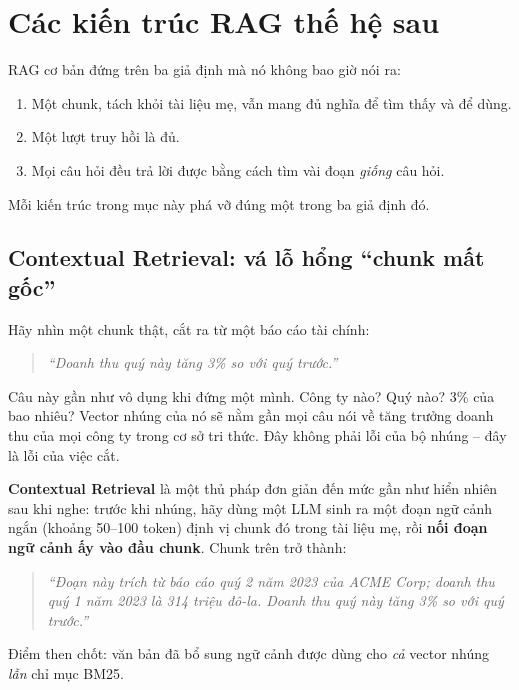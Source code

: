 
\section{Các kiến trúc RAG thế hệ sau}
\label{sec:advanced_rag_architectures}

RAG cơ bản đứng trên ba giả định mà nó không bao giờ nói ra:
\begin{enumerate}
	\item Một chunk, tách khỏi tài liệu mẹ, vẫn mang đủ nghĩa để tìm thấy và để dùng.
	\item Một lượt truy hồi là đủ.
	\item Mọi câu hỏi đều trả lời được bằng cách tìm vài đoạn \emph{giống} câu hỏi.
\end{enumerate}
Mỗi kiến trúc trong mục này phá vỡ đúng một trong ba giả định đó.

\subsection{Contextual Retrieval: vá lỗ hổng “chunk mất gốc”}
\label{ssec:contextual_retrieval}

Hãy nhìn một chunk thật, cắt ra từ một báo cáo tài chính:

\begin{quote}
\textit{“Doanh thu quý này tăng 3\% so với quý trước.”}
\end{quote}

\noindent Câu này gần như vô dụng khi đứng một mình. Công ty nào? Quý nào? 3\% của bao nhiêu? Vector nhúng của nó sẽ nằm gần mọi câu nói về tăng trưởng doanh thu của mọi công ty trong cơ sở tri thức. Đây không phải lỗi của bộ nhúng -- đây là lỗi của việc cắt.

\textbf{Contextual Retrieval} \cite{anthropic2024contextual} là một thủ pháp đơn giản đến mức gần như hiển nhiên sau khi nghe: trước khi nhúng, hãy dùng một LLM sinh ra một đoạn ngữ cảnh ngắn (khoảng 50--100 token) định vị chunk đó trong tài liệu mẹ, rồi \textbf{nối đoạn ngữ cảnh ấy vào đầu chunk}. Chunk trên trở thành:

\begin{quote}
\textit{“Đoạn này trích từ báo cáo quý 2 năm 2023 của ACME Corp; doanh thu quý 1 năm 2023 là 314 triệu đô-la. Doanh thu quý này tăng 3\% so với quý trước.”}
\end{quote}

\noindent Điểm then chốt: văn bản đã bổ sung ngữ cảnh được dùng cho \emph{cả} vector nhúng \emph{lẫn} chỉ mục BM25.

